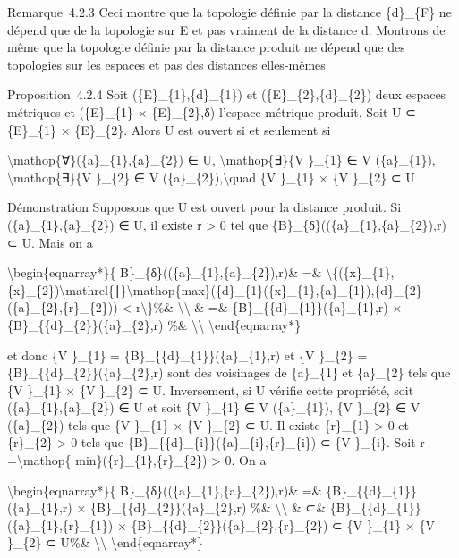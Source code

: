 \documentclass[]{article}
\begin{document}
Remarque~4.2.3 Ceci montre que la topologie définie par la distance
\{d\}\_\{F\} ne dépend que de la topologie sur E et pas vraiment de la
distance d. Montrons de même que la topologie définie par la distance
produit ne dépend que des topologies sur les espaces et pas des
distances elles-mêmes

Proposition~4.2.4 Soit (\{E\}\_\{1\},\{d\}\_\{1\}) et
(\{E\}\_\{2\},\{d\}\_\{2\}) deux espaces métriques et (\{E\}\_\{1\} ×
\{E\}\_\{2\},δ) l'espace métrique produit. Soit U ⊂ \{E\}\_\{1\} ×
\{E\}\_\{2\}. Alors U est ouvert si et seulement si~

\textbackslash{}mathop\{∀\}(\{a\}\_\{1\},\{a\}\_\{2\}) ∈ U,
\textbackslash{}mathop\{∃\}\{V \}\_\{1\} ∈ V (\{a\}\_\{1\}),
\textbackslash{}mathop\{∃\}\{V \}\_\{2\} ∈ V
(\{a\}\_\{2\}),\textbackslash{}quad \{V \}\_\{1\} × \{V \}\_\{2\} ⊂ U

Démonstration Supposons que U est ouvert pour la distance produit. Si
(\{a\}\_\{1\},\{a\}\_\{2\}) ∈ U, il existe r \textgreater{} 0 tel que
\{B\}\_\{δ\}((\{a\}\_\{1\},\{a\}\_\{2\}),r) ⊂ U. Mais on a

\textbackslash{}begin\{eqnarray*\}\{
B\}\_\{δ\}((\{a\}\_\{1\},\{a\}\_\{2\}),r)\& =\&
\textbackslash{}\{(\{x\}\_\{1\},\{x\}\_\{2\})\textbackslash{}mathrel\{∣\}\textbackslash{}mathop\{max\}(\{d\}\_\{1\}(\{x\}\_\{1\},\{a\}\_\{1\}),\{d\}\_\{2\}(\{a\}\_\{2\},\{r\}\_\{2\}))
\textless{} r\textbackslash{}\}\%\& \textbackslash{}\textbackslash{} \&
=\& \{B\}\_\{\{d\}\_\{1\}\}(\{a\}\_\{1\},r) ×
\{B\}\_\{\{d\}\_\{2\}\}(\{a\}\_\{2\},r) \%\&
\textbackslash{}\textbackslash{} \textbackslash{}end\{eqnarray*\}

et donc \{V \}\_\{1\} = \{B\}\_\{\{d\}\_\{1\}\}(\{a\}\_\{1\},r) et \{V
\}\_\{2\} = \{B\}\_\{\{d\}\_\{2\}\}(\{a\}\_\{2\},r) sont des voisinages
de \{a\}\_\{1\} et \{a\}\_\{2\} tels que \{V \}\_\{1\} × \{V \}\_\{2\} ⊂
U. Inversement, si U vérifie cette propriété, soit
(\{a\}\_\{1\},\{a\}\_\{2\}) ∈ U et soit \{V \}\_\{1\} ∈ V
(\{a\}\_\{1\}), \{V \}\_\{2\} ∈ V (\{a\}\_\{2\}) tels que \{V \}\_\{1\}
× \{V \}\_\{2\} ⊂ U. Il existe \{r\}\_\{1\} \textgreater{} 0 et
\{r\}\_\{2\} \textgreater{} 0 tels que
\{B\}\_\{\{d\}\_\{i\}\}(\{a\}\_\{i\},\{r\}\_\{i\}) ⊂ \{V \}\_\{i\}. Soit
r =\textbackslash{}mathop\{ min\}(\{r\}\_\{1\},\{r\}\_\{2\})
\textgreater{} 0. On a

\textbackslash{}begin\{eqnarray*\}\{
B\}\_\{δ\}((\{a\}\_\{1\},\{a\}\_\{2\}),r)\& =\&
\{B\}\_\{\{d\}\_\{1\}\}(\{a\}\_\{1\},r) ×
\{B\}\_\{\{d\}\_\{2\}\}(\{a\}\_\{2\},r) \%\&
\textbackslash{}\textbackslash{} \& ⊂\&
\{B\}\_\{\{d\}\_\{1\}\}(\{a\}\_\{1\},\{r\}\_\{1\}) ×
\{B\}\_\{\{d\}\_\{2\}\}(\{a\}\_\{2\},\{r\}\_\{2\}) ⊂ \{V \}\_\{1\} × \{V
\}\_\{2\} ⊂ U\%\& \textbackslash{}\textbackslash{}
\textbackslash{}end\{eqnarray*\}
\end{document}
